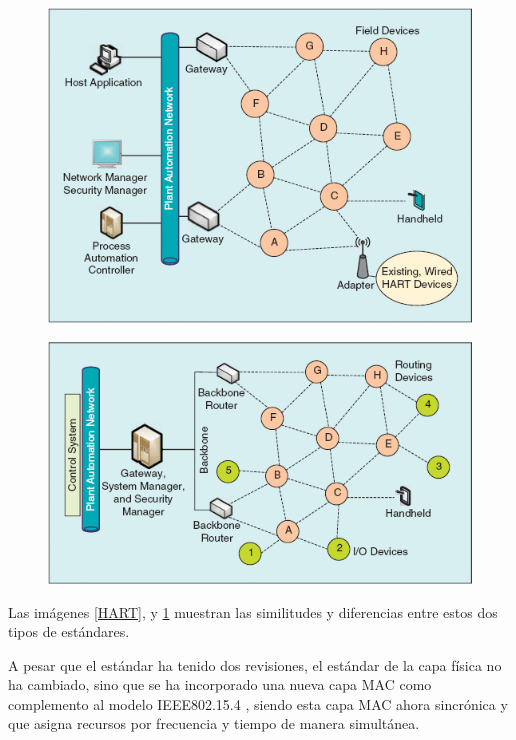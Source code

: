 \begin{figure}
\centering
\graphicspath{ {imagenes/} }
\begin{minipage}{.5\textwidth}
  \centering
  \includegraphics[width=.9\linewidth]{HART.png}
  \label{HART}
\end{minipage}%
\begin{minipage}{.5\textwidth}
  \centering
  \includegraphics[width=.9\linewidth]{ISA100.png}
  \label{ISA100}
\end{minipage}
\end{figure}

Las imágenes \ref{HART}, y \ref{ISA100} muestran las similitudes y diferencias entre estos dos tipos de estándares.\cite{petersen2011wirelesshart}




A pesar que el estándar ha tenido dos revisiones, el estándar de la capa física no ha cambiado, sino que se ha incorporado una nueva capa MAC como complemento al modelo IEEE802.15.4 \cite{RFC7554}, siendo esta capa MAC ahora sincrónica y que asigna recursos por frecuencia y tiempo de manera simultánea. \cite{watteyne2015using}

